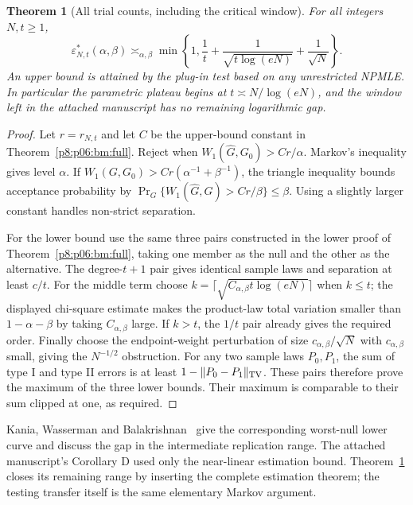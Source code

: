 \documentclass[11pt,a4paper]{article}
\newtheorem{theorem}{Theorem}[section]
\theoremstyle{definition}
\theoremstyle{remark}
\numberwithin{equation}{section}
\begin{document}
\begin{theorem}[All trial counts, including the critical window]
\label{p8:bt:testing}
For all integers $N,t\ge1$,
\[
 \varepsilon^*_{N,t}(\alpha,\beta)
 \asymp_{\alpha,\beta}
 \min\left\{1,\frac1t+\frac1{\sqrt{t\log(eN)}}+\frac1{\sqrt N}\right\}.
\]
An upper bound is attained by the plug-in test based on any unrestricted
NPMLE. In particular the parametric plateau begins at
$t\asymp N/\log(eN)$, and the window left in the attached manuscript
has no remaining logarithmic gap.
\end{theorem}
\begin{proof}
Let $r=r_{N,t}$ and let $C$ be the upper-bound constant in
Theorem~\ref{p8:p06:bm:full}. Reject when
$W_1(\widehat G,G_0)>Cr/\alpha$. Markov's inequality gives level
$\alpha$. If $W_1(G,G_0)>Cr(\alpha^{-1}+\beta^{-1})$, the triangle
inequality bounds acceptance probability by
$\Pr_G\{W_1(\widehat G,G)>Cr/\beta\}\le\beta$.
Using a slightly larger constant handles non-strict separation.

For the lower bound use the same three pairs constructed in the lower
proof of Theorem~\ref{p8:p06:bm:full}, taking one member as the null and
the other as the alternative. The degree-$t+1$ pair gives identical
sample laws and separation at least $c/t$. For the middle term choose
$k=\lceil\sqrt{C_{\alpha,\beta}t\log(eN)}\rceil$ when $k\le t$;
the displayed chi-square estimate makes the product-law total variation
smaller than $1-\alpha-\beta$ by taking $C_{\alpha,\beta}$ large.
If $k>t$, the $1/t$ pair already gives the required order. Finally
choose the endpoint-weight perturbation of size
$c_{\alpha,\beta}/\sqrt N$ with $c_{\alpha,\beta}$ small, giving
the $N^{-1/2}$ obstruction. For any two sample laws $P_0,P_1$,
the sum of type I and type II errors is at least
$1-\|P_0-P_1\|_{\rm TV}$. These pairs therefore prove the maximum
of the three lower bounds. Their maximum is comparable to their sum
clipped at one, as required.
\end{proof}

Kania, Wasserman and Balakrishnan~\cite[Section 3, Theorem 3]{p8:BT_KWB2025}
give the corresponding worst-null lower curve and discuss the gap in
the intermediate replication range. The attached manuscript's
Corollary D used only the near-linear estimation bound. Theorem~\ref{p8:bt:testing}
closes its remaining range by inserting the complete estimation theorem;
the testing transfer itself is the same elementary Markov argument.
\end{document}
